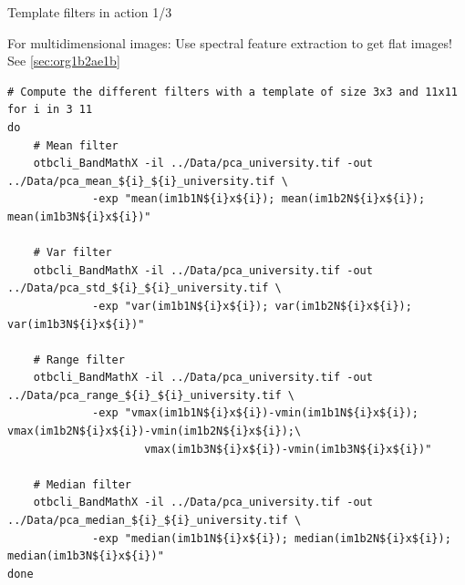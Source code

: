 \documentclass[10pt,aspectratio=1610]{beamer}
\begin{document}
\begin{frame}[fragile,label={sec:org1d5afec}]{Template filters in action 1/3}
 \begin{center}
\alert{For multidimensional images: Use spectral feature extraction to get flat images!} See \ref{sec:org1b2ae1b}
\end{center}

\begin{verbatim}
# Compute the different filters with a template of size 3x3 and 11x11
for i in 3 11
do
    # Mean filter
    otbcli_BandMathX -il ../Data/pca_university.tif -out ../Data/pca_mean_${i}_${i}_university.tif \
		     -exp "mean(im1b1N${i}x${i}); mean(im1b2N${i}x${i}); mean(im1b3N${i}x${i})"

    # Var filter
    otbcli_BandMathX -il ../Data/pca_university.tif -out ../Data/pca_std_${i}_${i}_university.tif \
		     -exp "var(im1b1N${i}x${i}); var(im1b2N${i}x${i}); var(im1b3N${i}x${i})"

    # Range filter
    otbcli_BandMathX -il ../Data/pca_university.tif -out ../Data/pca_range_${i}_${i}_university.tif \
		     -exp "vmax(im1b1N${i}x${i})-vmin(im1b1N${i}x${i}); vmax(im1b2N${i}x${i})-vmin(im1b2N${i}x${i});\
                     vmax(im1b3N${i}x${i})-vmin(im1b3N${i}x${i})"

    # Median filter
    otbcli_BandMathX -il ../Data/pca_university.tif -out ../Data/pca_median_${i}_${i}_university.tif \
		     -exp "median(im1b1N${i}x${i}); median(im1b2N${i}x${i}); median(im1b3N${i}x${i})"
done
\end{verbatim}
\end{frame}
\end{document}
